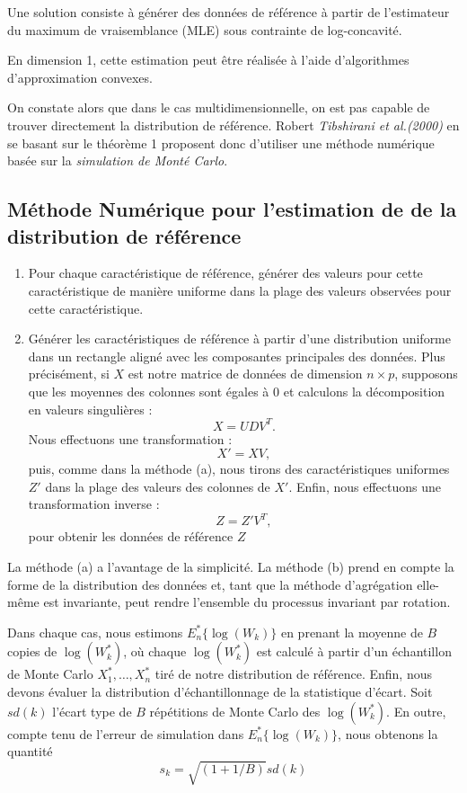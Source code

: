 Une solution consiste à générer des données de référence à partir de l'estimateur du maximum de vraisemblance (MLE) sous contrainte de log-concavité.

En dimension 1, cette estimation peut être réalisée à l'aide d'algorithmes d'approximation convexes.

On constate alors que dans le cas multidimensionnelle, on est pas capable de trouver directement la distribution de référence. Robert \textit{Tibshirani et al.(2000)} en se basant sur le théorème 1 proposent donc d'utiliser une méthode numérique basée sur la \textit{simulation de Monté Carlo}.


\subsection{Méthode Numérique pour l'estimation de de la distribution de référence}

\begin{enumerate}[label=(\alph*)] %
	\item Pour chaque caractéristique de référence, générer des valeurs pour cette caractéristique de manière uniforme dans la plage des valeurs observées pour cette caractéristique.
	
	\item Générer les caractéristiques de référence à partir d'une distribution uniforme dans un rectangle aligné avec les composantes principales des données. Plus précisément, si \(X\) est notre matrice de données de dimension \(n \times p\), supposons que les moyennes des colonnes sont égales à \(0\) et calculons la décomposition en valeurs singulières : 
	\[
	X = UDV^{T}.
	\]
	Nous effectuons une transformation : 
	\[
	X' = XV,
	\]
	puis, comme dans la méthode (a), nous tirons des caractéristiques uniformes \(Z'\) dans la plage des valeurs des colonnes de \(X'\). Enfin, nous effectuons une transformation inverse : 
	\[
	Z = Z'V^{T},
	\]
	pour obtenir les données de référence \(Z\)
\end{enumerate}

La méthode (a) a l'avantage de la simplicité. La méthode (b) prend en compte la forme de la distribution des données et, tant que la méthode d'agrégation elle-même est invariante, peut rendre l'ensemble du processus invariant par rotation.

Dans chaque cas, nous estimons \(E_{n}^{*}\{\log (W_{k})\}\) en prenant la moyenne de \(B\) copies de \(\log (W_{k}^{*})\), où chaque \(\log (W_{k}^{*})\) est calculé à partir d'un échantillon de Monte Carlo $X_{1}^{*}, \ldots, X_{n}^{*}$ tiré de notre distribution de référence. Enfin, nous devons évaluer la distribution d'échantillonnage de la statistique d'écart. Soit \(sd(k)\) l'écart type de \(B\) répétitions de Monte Carlo des \(\log (W_{k}^{*})\). En outre, compte tenu de l'erreur de simulation dans \(E_{n}^{*}\{\log (W_{k})\}\), nous obtenons la quantité
\[
s_{k}=\sqrt{(1 + 1 / B)} sd(k)
\]

